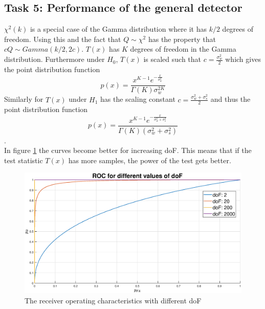 \subsection{Task 5: Performance of the general detector}
$\chi^2(k)$ is a special case of the Gamma distribution where it has $k/2$ degrees of freedom. Using this and the fact that $Q\sim\chi^2$ has the property that $cQ\sim Gamma(k/2, 2c)$. $T(x)$ has $K$ degrees of freedom in the Gamma distribution. Furthermore under $H_0$, $T(x)$ is scaled such that $c = \frac{\sigma_w^2}{2}$ which gives the point distribution function
\begin{equation}
    p(x) = \frac{x^{K-1}e^{-\frac{x}{\sigma_w^2}}}{\Gamma(K)\sigma_w^{2K}}
\end{equation}
Similarly for $T(x)$ under $H_1$ has the scaling constant $c = \frac{\sigma_w^2+\sigma_s^2}{2}$ and thus the point distribution function
\begin{equation}
    p(x) = \frac{x^{K-1}e^{-\frac{x}{\sigma_w^2+\sigma_s^2}}}{\Gamma(K)(\sigma_w^{2}+\sigma_s^2)}
\end{equation}.\\
In figure \ref{fig:roc} the curves become better for increasing doF. This means that if the test statistic $T(x)$ has more samples, the power of the test gets better.
\begin{figure}
    \centering
    \includegraphics[width=\textwidth]{figures/roc2.eps}
    \caption{The receiver operating characteristics with different doF}
    \label{fig:roc}
\end{figure}

